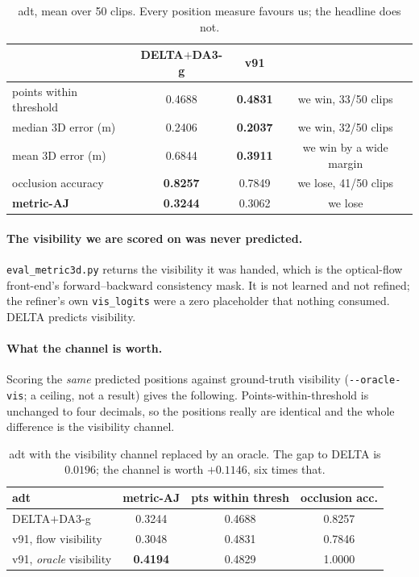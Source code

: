 \documentclass[11pt,a4paper]{article}
\begin{document}
\begin{table}[h]
\centering
\caption{adt, mean over 50 clips. Every position measure favours us; the headline does not.}
\label{tab:adt-split}
\begin{tabular}{lccc}
\toprule
 & DELTA$+$DA3-g & v91 & \\
\midrule
points within threshold      & 0.4688 & \textbf{0.4831} & we win, 33/50 clips \\
median 3D error (m)          & 0.2406 & \textbf{0.2037} & we win, 32/50 clips \\
mean 3D error (m)            & 0.6844 & \textbf{0.3911} & we win by a wide margin \\
occlusion accuracy           & \textbf{0.8257} & 0.7849 & we lose, 41/50 clips \\
\midrule
\textbf{metric-AJ}           & \textbf{0.3244} & 0.3062 & we lose \\
\bottomrule
\end{tabular}
\end{table}

\paragraph{The visibility we are scored on was never predicted.}
\texttt{eval\_metric3d.py} returns the visibility it was handed, which is the optical-flow
front-end's forward--backward consistency mask. It is not learned and not refined; the refiner's own
\texttt{vis\_logits} were a zero placeholder that nothing consumed. DELTA predicts visibility.

\paragraph{What the channel is worth.}
Scoring the \emph{same} predicted positions against ground-truth visibility
(\texttt{-{}-oracle-vis}; a ceiling, not a result) gives the following. Points-within-threshold is
unchanged to four decimals, so the positions really are identical and the whole difference is the
visibility channel.

\begin{table}[h]
\centering
\caption{adt with the visibility channel replaced by an oracle. The gap to DELTA is $0.0196$; the
channel is worth $+0.1146$, six times that.}
\label{tab:adt-oracle}
\begin{tabular}{lccc}
\toprule
adt & metric-AJ & pts within thresh & occlusion acc. \\
\midrule
DELTA$+$DA3-g               & 0.3244 & 0.4688 & 0.8257 \\
v91, flow visibility        & 0.3048 & 0.4831 & 0.7846 \\
v91, \emph{oracle} visibility & \textbf{0.4194} & 0.4829 & 1.0000 \\
\bottomrule
\end{tabular}
\end{table}
\end{document}
